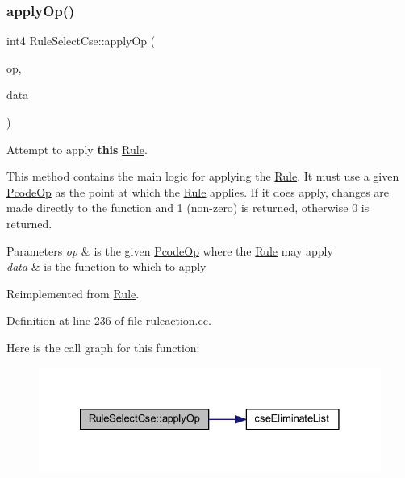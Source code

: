 \subsubsection{\texorpdfstring{applyOp()}{applyOp()}}
{\footnotesize\ttfamily int4 Rule\+Select\+Cse\+::apply\+Op (\begin{DoxyParamCaption}\item[{\mbox{\hyperlink{class_pcode_op}{Pcode\+Op}} $\ast$}]{op,  }\item[{\mbox{\hyperlink{class_funcdata}{Funcdata}} \&}]{data }\end{DoxyParamCaption})\hspace{0.3cm}{\ttfamily [virtual]}}



Attempt to apply {\bfseries{this}} \mbox{\hyperlink{class_rule}{Rule}}. 

This method contains the main logic for applying the \mbox{\hyperlink{class_rule}{Rule}}. It must use a given \mbox{\hyperlink{class_pcode_op}{Pcode\+Op}} as the point at which the \mbox{\hyperlink{class_rule}{Rule}} applies. If it does apply, changes are made directly to the function and 1 (non-\/zero) is returned, otherwise 0 is returned. 
\begin{DoxyParams}{Parameters}
{\em op} & is the given \mbox{\hyperlink{class_pcode_op}{Pcode\+Op}} where the \mbox{\hyperlink{class_rule}{Rule}} may apply \\
\hline
{\em data} & is the function to which to apply \\
\hline
\end{DoxyParams}


Reimplemented from \mbox{\hyperlink{class_rule_a4e3e61f066670175009f60fb9dc60848}{Rule}}.



Definition at line 236 of file ruleaction.\+cc.

Here is the call graph for this function\+:
\nopagebreak
\begin{figure}[H]
\begin{center}
\leavevmode
\includegraphics[width=328pt]{class_rule_select_cse_a2b1b3ea7c8acf61be61ab068385ec967_cgraph}
\end{center}
\end{figure}
\mbox{\label{class_rule_select_cse_ab2c0796a0126999042fd074de0e379fb}} 
